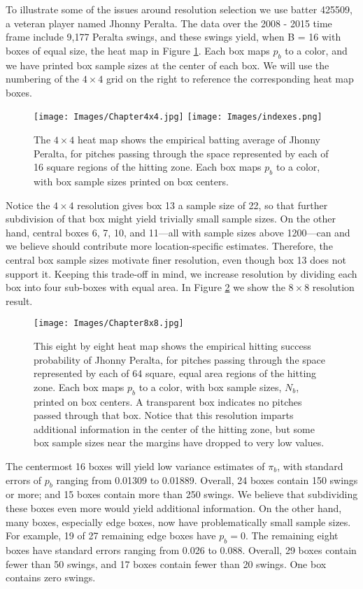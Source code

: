 To illustrate some of the issues around resolution selection we use batter 425509, a veteran player named Jhonny Peralta. The data over the 2008 - 2015 time frame include 9,177 Peralta swings, and these swings yield, when B = 16 with boxes of equal size, the heat map in Figure \ref{fig:4x4}.
Each box maps $p_{b}$ to a color, and we have printed box sample sizes at the center of each box. We will use the numbering of the $4 \times 4$ grid on the right to reference the corresponding heat map boxes. 
        \begin{figure}[H]
      	\centering
      	\texttt{[image: Images/Chapter4x4.jpg]} 
      	\texttt{[image: Images/indexes.png]}
      	\caption{The $4 \times 4$ heat map shows the empirical batting average of Jhonny Peralta, for pitches passing through the space represented by each of 16 square regions of the hitting zone. Each box maps $p_{b}$ to a color, with box sample sizes printed on box centers.}
      	\label{fig:4x4}
      	\end{figure} 
Notice the $4 \times 4$ resolution gives box 13 a sample size of 22, so that further subdivision of that box might yield trivially small sample sizes. On the other hand, central boxes 6, 7, 10, and 11---all with sample sizes above 1200---can and we believe should contribute more location-specific estimates. Therefore, the central box sample sizes motivate finer resolution, even though box 13 does not support it. Keeping this trade-off in mind, we increase resolution by dividing each box into four sub-boxes with equal area. In Figure \ref{fig:8x8} we show the $8 \times 8$ resolution result.
        \begin{figure}[H]
      	\centering
      	\texttt{[image: Images/Chapter8x8.jpg]} 
      	\caption{This eight by eight heat map shows the empirical hitting success probability of Jhonny Peralta, for pitches passing through the space represented by each of 64 square, equal area regions of the hitting zone. Each box maps $p_{b}$ to a color, with box sample sizes, $N_{b}$, printed on box centers. A transparent box indicates no pitches passed through that box. Notice that this resolution imparts additional information in the center of the hitting zone, but some box sample sizes near the margins have dropped to very low values.}
      	\label{fig:8x8}
      	\end{figure} 
The centermost 16 boxes will yield low variance estimates of $\pi_{b}$, with standard errors of $p_{b}$ ranging from 0.01309 to 0.01889. Overall, 24 boxes contain 150 swings or more; and 15 boxes contain more than 250 swings. We believe that subdividing these boxes even more would yield additional information. On the other hand, many boxes, especially edge boxes, now have problematically small sample sizes. For example, 19 of 27 remaining edge boxes have $p_{b} = 0$. The remaining eight boxes have standard errors ranging from 0.026 to 0.088. Overall, 29 boxes contain fewer than 50 swings, and 17 boxes contain fewer than 20 swings. One box contains zero swings.

